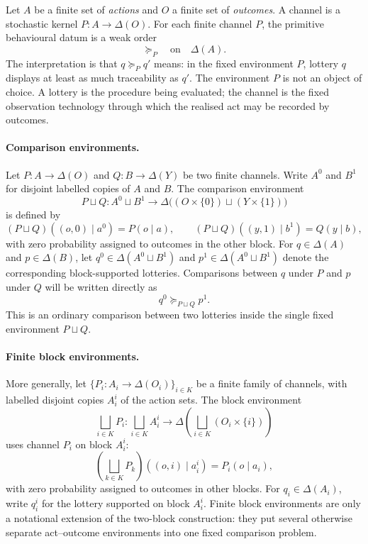 \documentclass[11pt,a4paper]{article}
\theoremstyle{definition}
\newcommand{\1}{\mathbf 1}
\begin{document}
Let $A$ be a finite set of \emph{actions} and $O$ a finite set of \emph{outcomes}.  A channel is a stochastic kernel
$P:A\to\Delta(O)$.  For each finite channel $P$, the primitive behavioural datum is a weak order
\[
\succeq_P\quad\text{on}\quad \Delta(A).
\]
The interpretation is that $q\succeq_P q'$ means: in the fixed environment $P$, lottery $q$ displays at least as much
traceability as $q'$.
The environment $P$ is not an object of choice.  A lottery is the procedure being evaluated; the channel is the fixed
observation technology through which the realised act may be recorded by outcomes.

\paragraph{Comparison environments.}
Let $P:A\to\Delta(O)$ and $Q:B\to\Delta(Y)$ be two finite channels.  Write $A^0$ and $B^1$ for disjoint labelled
copies of $A$ and $B$.  The comparison environment
\[
P\sqcup Q:
A^0\sqcup B^1\to\Delta\bigl((O\times\{0\})\sqcup(Y\times\{1\})\bigr)
\]
is defined by
\[
(P\sqcup Q)((o,0)\mid a^0)=P(o\mid a),
\qquad
(P\sqcup Q)((y,1)\mid b^1)=Q(y\mid b),
\]
with zero probability assigned to outcomes in the other block.  For $q\in\Delta(A)$ and $p\in\Delta(B)$, let
$q^0\in\Delta(A^0\sqcup B^1)$ and $p^1\in\Delta(A^0\sqcup B^1)$ denote the corresponding block-supported lotteries.
Comparisons between $q$ under $P$ and $p$ under $Q$ will be written directly as
\[
q^0\succeq_{P\sqcup Q}p^1.
\]
This is an ordinary comparison between two lotteries inside the single fixed environment $P\sqcup Q$.

\paragraph{Finite block environments.}
More generally, let $\{P_i:A_i\to\Delta(O_i)\}_{i\in K}$ be a finite family of channels, with labelled disjoint copies
$A_i^i$ of the action sets.  The block environment
\[
\bigsqcup_{i\in K}P_i:
\bigsqcup_{i\in K}A_i^i
\to
\Delta\left(\bigsqcup_{i\in K}(O_i\times\{i\})\right)
\]
uses channel $P_i$ on block $A_i^i$:
\[
\left(\bigsqcup_{k\in K}P_k\right)((o,i)\mid a_i^i)=P_i(o\mid a_i),
\]
with zero probability assigned to outcomes in other blocks.  For $q_i\in\Delta(A_i)$, write $q_i^i$ for the lottery
supported on block $A_i^i$.
Finite block environments are only a notational extension of the two-block construction: they put several otherwise
separate act--outcome environments into one fixed comparison problem.
\end{document}
